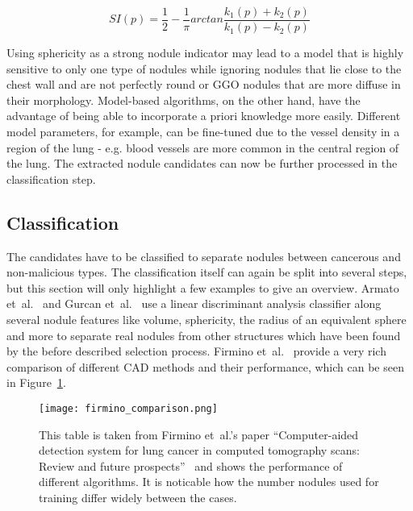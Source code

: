 \documentclass[main.tex]{subfiles}
\begin{document}
\begin{equation} \label{eq:SI}
SI(p)=\frac{1}{2}-\frac{1}{\pi}arctan\frac{k_1(p)+k_2(p)}{k_1(p)-k_2(p)}
\end{equation}

Using sphericity as a strong nodule indicator may lead to a model that is highly sensitive to only one type of nodules while ignoring nodules that lie close to the chest wall and are not perfectly round or GGO nodules that are more diffuse in their morphology. Model-based algorithms, on the other hand, have the advantage of being able to incorporate a priori knowledge more easily. Different model parameters, for example, can be fine-tuned due to the vessel density in a region of the lung - e.g. blood vessels are more common in the central region of the lung. The extracted nodule candidates can now be further processed in the classification step.


\subsection{Classification}
The candidates have to be classified to separate nodules between cancerous and non-malicious types. The classification itself can again be split into several steps, but this section will only highlight a few examples to give an overview. Armato et~al.~\cite{armato1999computerized} and Gurcan et~al.~\cite{gurcan2002lung} use a linear discriminant analysis classifier along several nodule features like volume, sphericity, the radius of an equivalent sphere and more to separate real nodules from other structures which have been found by the before described selection process. Firmino et~al.~\cite{firmino2014computer} provide a very rich comparison of different CAD methods and their performance, which can be seen in Figure~\ref{fig:firmino_comp}.

\begin{figure}[ht]
\centering
\texttt{[image: firmino\_comparison.png]}
\caption{This table is taken from Firmino et~al.'s paper ``Computer-aided detection system for lung cancer in computed tomography scans: Review and future prospects''~\cite{firmino2014computer} and shows the performance of different algorithms. It is noticable how the number nodules used for training differ widely between the cases.}
\label{fig:firmino_comp}
\end{figure}
\end{document}
